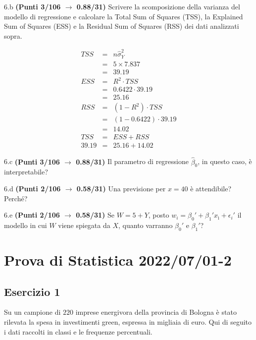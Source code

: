 \documentclass[
  11pt,
]{book}
\theoremstyle{mytheoremstyle}
\theoremstyle{mydefstyle}
\newenvironment{sol}
  {
  \begin{tcolorbox}[enhanced,breakable,arc=0.1mm,boxrule=1pt,colback=white,colframe=iblue,
  title=\bf \fontfamily{lmss}\selectfont \hspace{.5 cm} Soluzione,drop fuzzy shadow]

}{
\end{tcolorbox}
  }
\begin{document}
6.b \textbf{(Punti 3/106 \(\rightarrow\) 0.88/31)} Scrivere la scomposizione della varianza del modello di regressione
e calcolare la Total Sum of Squares (TSS), la Explained Sum of Squares (ESS) e la Residual Sum of Squares (RSS) dei dati analizzati sopra.

\begin{sol}
\begin{eqnarray*}
   TSS &=& n\hat\sigma^2_Y\\
      &=& 5 \times 7.837 \\
      &=&  39.19 \\
   ESS &=& R^2\cdot TSS\\
      &=&  0.6422 \cdot 39.19 \\
      &=& 25.16 \\
   RSS &=& (1-R^2)\cdot TSS\\
      &=& (1- 0.6422 )\cdot 39.19 \\
      &=&  14.02 \\
   TSS &=& ESS+RSS \\ 39.19  &=&  25.16 + 14.02 
  \end{eqnarray*}

\end{sol}

6.c \textbf{(Punti 3/106 \(\rightarrow\) 0.88/31)} Il parametro di regressione \(\hat\beta_0\), in questo caso, è interpretabile?

6.d \textbf{(Punti 2/106 \(\rightarrow\) 0.58/31)} Una previsione per \(x=40\) è attendibile? Perché?

6.e \textbf{(Punti 2/106 \(\rightarrow\) 0.58/31)} Se \(W=5+ Y\), posto \(w_i=\beta_0'+\beta_1'x_ì +\epsilon_i'\)
il modello in cui \(W\) viene spiegata da \(X\), quanto varranno \(\beta_0'\) e \(\beta_1'\)?

\section{Prova di Statistica 2022/07/01-2}\label{prova-di-statistica-20220701-2}

\subsection{Esercizio 1}\label{esercizio-1-14}

Su un campione di \(220\) imprese energivora della provincia di Bologna è stato
rilevata la spesa in investimenti green, espressa in migliaia di euro. Qui di seguito i dati raccolti in classi
e le frequenze percentuali.
\end{document}
